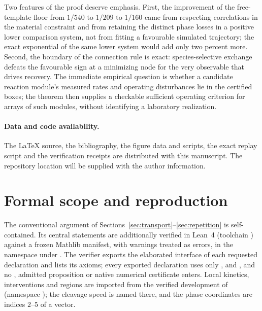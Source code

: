 \documentclass[11pt,a4paper]{article}
\newcommand{\RepositoryNote}{The repository location will be supplied with the author information.}
\theoremstyle{plain}
\theoremstyle{definition}
\theoremstyle{remark}
\begin{document}
Two features of the proof deserve emphasis. First, the improvement of the free-template floor from $1/540$ to $1/209$ to $1/160$ came from respecting correlations in the material constraint and from retaining the distinct phase losses in a positive lower comparison system, not from fitting a favourable simulated trajectory; the exact exponential of the same lower system would add only two percent more. Second, the boundary of the connection rule is exact: species-selective exchange defeats the favourable sign at a minimizing node for the very observable that drives recovery. The immediate empirical question is whether a candidate reaction module's measured rates and operating disturbances lie in the certified boxes; the theorem then supplies a checkable sufficient operating criterion for arrays of such modules, without identifying a laboratory realization.

\paragraph{Data and code availability.}
The LaTeX source, the bibliography, the figure data and scripts, the exact replay script and the verification receipts are distributed with this manuscript. \RepositoryNote

\appendix
\section{Formal scope and reproduction}\label{app:formal}
The conventional argument of Sections~\ref{sec:transport}--\ref{sec:repetition} is self-contained. Its central statements are additionally verified in Lean~4 (toolchain ) against a frozen Mathlib manifest, with warnings treated as errors, in the namespace  under . The verifier exports the elaborated interface of each requested declaration and lists its axioms; every exported declaration uses only ,  and , and no , admitted proposition or native numerical certificate enters. Local kinetics, interventions and regions are imported from the verified development of~\citep{recovery2026} (namespace ); the cleavage speed is named  there, and the phase coordinates are indices $2$--$5$ of a  vector.
\end{document}
